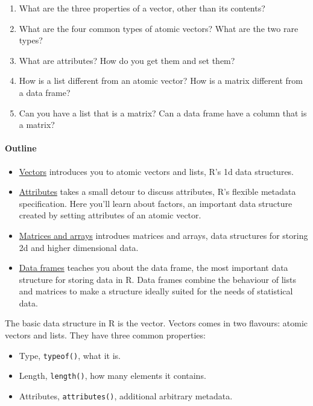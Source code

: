 \begin{enumerate}
\def\labelenumi{\arabic{enumi}.}
\item
  What are the three properties of a vector, other than its contents?
\item
  What are the four common types of atomic vectors? What are the two
  rare types?
\item
  What are attributes? How do you get them and set them?
\item
  How is a list different from an atomic vector? How is a matrix
  different from a data frame?
\item
  Can you have a list that is a matrix? Can a data frame have a column
  that is a matrix?
\end{enumerate}

\paragraph{Outline}\label{outline}

\begin{itemize}
\item
  \hyperref[vectors]{Vectors} introduces you to atomic vectors and
  lists, R's 1d data structures.
\item
  \hyperref[attributes]{Attributes} takes a small detour to discuss
  attributes, R's flexible metadata specification. Here you'll learn
  about factors, an important data structure created by setting
  attributes of an atomic vector.
\item
  \hyperref[matrices-and-arrays]{Matrices and arrays} introdues matrices
  and arrays, data structures for storing 2d and higher dimensional
  data.
\item
  \hyperref[data-frames]{Data frames} teaches you about the data frame,
  the most important data structure for storing data in R. Data frames
  combine the behaviour of lists and matrices to make a structure
  ideally suited for the needs of statistical data.
\end{itemize}


The basic data structure in R is the vector. Vectors comes in two
flavours: atomic vectors and lists. They have three common properties:

\begin{itemize}
\itemsep1pt\parskip0pt
\item
  Type, \texttt{typeof()}, what it is.
\item
  Length, \texttt{length()}, how many elements it contains.
\item
  Attributes, \texttt{attributes()}, additional arbitrary metadata.
\end{itemize}

